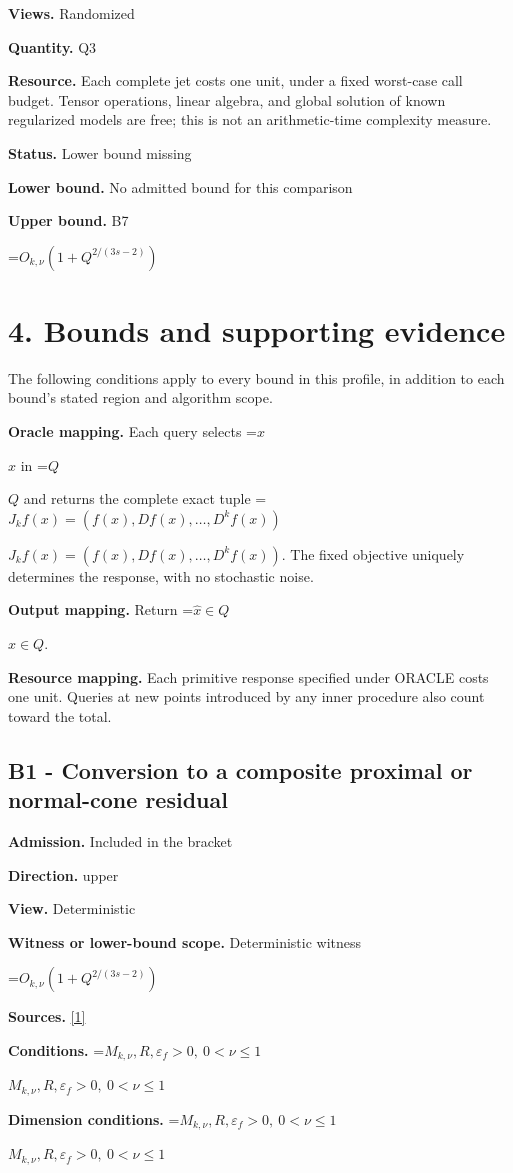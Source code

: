 \documentclass[10pt,a4paper]{article}
\newcommand{\AtlasMath}[1]{\par\begingroup\centering\setbox0=\hbox{$\displaystyle #1$}\ifdim\wd0>1.4\linewidth\typeout{ATLAS WIDE FORMULA: \the\wd0}\fi\ifdim\wd0>\linewidth\resizebox{\linewidth}{!}{\box0}\else\box0\fi\par\endgroup}
\newcommand{\AtlasInlineMath}[1]{\begingroup\setbox0=\hbox{$#1$}\ifdim\wd0>.4\linewidth\endgroup\AtlasMath{#1}\else\endgroup$#1$\fi}
\begin{document}
\textbf{Views.} Randomized

\textbf{Quantity.} Q3

\textbf{Resource.} Each complete jet costs one unit, under a fixed worst-case call budget. Tensor operations, linear algebra, and global solution of known regularized models are free; this is not an arithmetic-time complexity measure.

\textbf{Status.} Lower bound missing

\textbf{Lower bound.} No admitted bound for this comparison

\textbf{Upper bound.} B7

\AtlasMath{O_{k,\nu}(1+Q^{2/(3s-2)})}
\section{4. Bounds and supporting evidence}
The following conditions apply to every bound in this profile, in addition to each bound's stated region and algorithm scope.

\textbf{Oracle mapping.} Each query selects \AtlasInlineMath{x} in \AtlasInlineMath{Q} and returns the complete exact tuple \AtlasInlineMath{J_{k}f(x)=(f(x),Df(x),\ldots,D^{k}f(x))}. The fixed objective uniquely determines the response, with no stochastic noise.

\textbf{Output mapping.} Return \AtlasInlineMath{\widehat{x}\in Q}.

\textbf{Resource mapping.} Each primitive response specified under ORACLE costs one unit. Queries at new points introduced by any inner procedure also count toward the total.

\subsection{B1 - Conversion to a composite proximal or normal-cone residual}
\textbf{Admission.} Included in the bracket

\textbf{Direction.} upper

\textbf{View.} Deterministic

\textbf{Witness or lower-bound scope.} Deterministic witness

\AtlasMath{O_{k,\nu}(1+Q^{2/(3s-2)})}
\textbf{Sources.} \href{https://arxiv.org/pdf/2411.08987v2}{[1]}

\textbf{Conditions.} \AtlasInlineMath{M_{k,\nu},R,\varepsilon_f>0,\ 0<\nu\le1}

\textbf{Dimension conditions.} \AtlasInlineMath{M_{k,\nu},R,\varepsilon_f>0,\ 0<\nu\le1}
\end{document}
